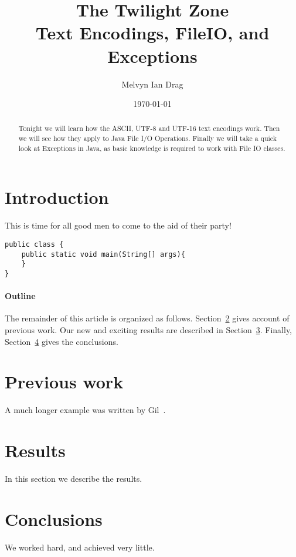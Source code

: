 \documentclass[12pt]{article}
\title{\textbf{The Twilight Zone} \\
\Large Text Encodings, FileIO, and Exceptions }
\author{
	Melvyn Ian Drag
}
\date{\today}
\begin{document}
\maketitle

\begin{abstract}
Tonight we will learn how the ASCII, UTF-8 and UTF-16 text encodings work. Then we will see how they apply to Java File I/O Operations. Finally we will take a quick look at Exceptions in Java, as basic knowledge is required to work with File IO classes.
\end{abstract}

\section{Introduction}
This is time for all good men to come to the aid of their party!
\begin{lstlisting}
public class {
	public static void main(String[] args){
	}
}
\end{lstlisting}
\paragraph{Outline}
The remainder of this article is organized as follows.
Section~\ref{previous work} gives account of previous work.
Our new and exciting results are described in Section~\ref{results}.
Finally, Section~\ref{conclusions} gives the conclusions.

\section{Previous work}\label{previous work}
A much longer \LaTeXe{} example was written by Gil~\cite{Gil:02}.

\section{Results}\label{results}
In this section we describe the results.

\section{Conclusions}\label{conclusions}
We worked hard, and achieved very little.
\end{document}
